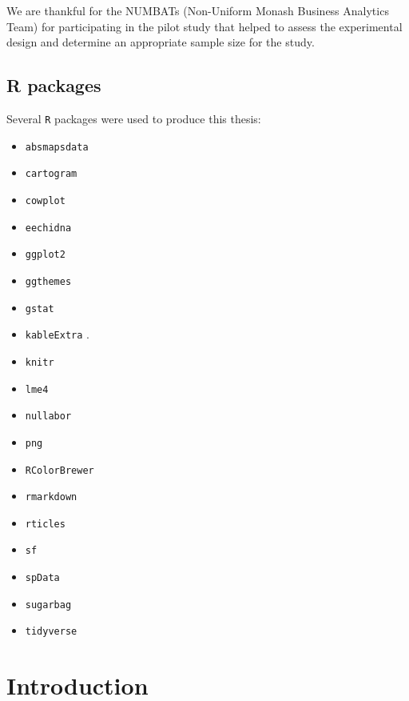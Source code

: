 \documentclass{monashthesis}
\begin{document}
We are thankful for the NUMBATs (Non-Uniform Monash Business Analytics Team) for participating in the pilot study that helped to assess the experimental design and determine an appropriate sample size for the study.

\hypertarget{r-packages}{%
\section*{R packages}\label{r-packages}}

Several \texttt{R} \autocite{R} packages were used to produce this thesis:

\begin{itemize}
\tightlist
\item
  \texttt{absmapsdata} \autocite{ABSmaps}
\item
  \texttt{cartogram} \autocite{cartogram}
\item
  \texttt{cowplot} \autocite{cowplot}
\item
  \texttt{eechidna} \autocite{eechidna}
\item
  \texttt{ggplot2} \autocite{ggplot2}
\item
  \texttt{ggthemes} \autocite{ggthemes}
\item
  \texttt{gstat} \autocite{gstat}
\item
  \texttt{kableExtra} \autocite{kableExtra}.
\item
  \texttt{knitr} \autocite{knitr}
\item
  \texttt{lme4} \autocite{lme4}
\item
  \texttt{nullabor} \autocite{nullabor}
\item
  \texttt{png} \autocite{png}
\item
  \texttt{RColorBrewer} \autocite{RColorBrewer}
\item
  \texttt{rmarkdown} \autocite{rmarkdown}
\item
  \texttt{rticles} \autocite{rticles}
\item
  \texttt{sf} \autocite{sf}
\item
  \texttt{spData} \autocite{spData}
\item
  \texttt{sugarbag} \autocite{sugarbag}
\item
  \texttt{tidyverse} \autocite{tidyverse}
\end{itemize}

\hypertarget{ch:intro}{%
\chapter{Introduction}\label{ch:intro}}
\end{document}
